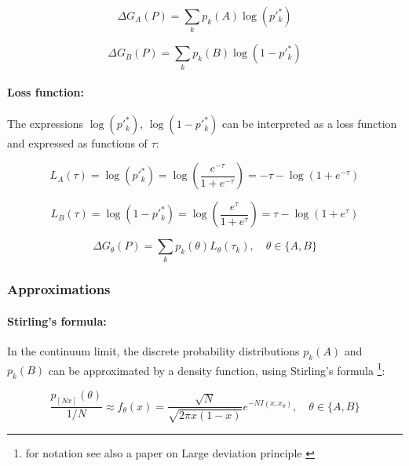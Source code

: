 \documentclass{article}
\theoremstyle{definition}
\begin{document}
\begin{equation}
    \Delta G_A(P) = \sum_{k} p_k(A) \log \left ( p'^*_k \right )
\end{equation}

\begin{equation}
    \Delta G_B(P) = \sum_{k} p_k(B) \log \left ( 1 - p'^*_k \right )
\end{equation}

\paragraph{Loss function:}

The expressions $\log \left ( p'^*_k \right )$, $\log \left ( 1- p'^*_k \right )$ can be interpreted as a loss function and expressed as functions of $\tau$:

\begin{equation}
    L_A(\tau) = \log \left ( p'^*_k \right ) =
    \log \left ( \frac{e^{-\tau}}{1 + e^{-\tau}} \right ) = 
    - \tau - \log \left ( 1 + e^{-\tau} \right )
\end{equation}

\begin{equation}
    L_B(\tau) = \log \left ( 1 - p'^*_k \right ) =
    \log \left ( \frac{e^{\tau}}{1 + e^{\tau}} \right ) = 
     \tau - \log \left ( 1 + e^{\tau} \right )
\end{equation}

\begin{equation}
    \Delta G_\theta(P) = \sum_{k} p_k(\theta) L_\theta(\tau_k), \quad
    \theta \in \{A,B\}
\end{equation}

\subsubsection{Approximations}
\label{sec:SEC_Approx}

\paragraph{Stirling’s formula:}

In the continuum limit, the discrete probability distributions $p_k(A)$ and $p_k(B)$ can be approximated by a density function, using Stirling's formula \cite{paper:Stirling} \footnote{for notation see also a paper on Large deviation principle \cite{arxiv:LDP}}:

\begin{equation}
    \frac{p_{[N x]}(\theta)}{1/N} \approx f_\theta(x) = \frac{\sqrt{N}}{\sqrt{2 \pi x (1-x)}} e^{- N I(x,x_\theta)}, \quad
    \theta \in \{A,B\}
\end{equation}
\end{document}
